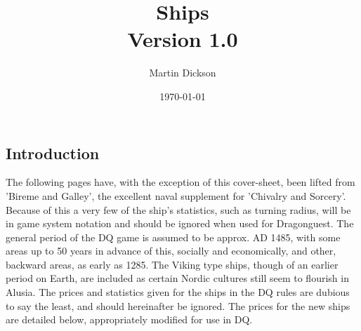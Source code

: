 \documentclass{article}
\title{Ships\\Version 1.0}
\author{Martin Dickson}
\date{\today}
\begin{document}
\maketitle

\tableofcontents

\pagebreak

\begin{multicols}{3}

\section{Introduction}

The following pages have, with the exception of this cover-sheet, been
lifted from 'Bireme and Galley', the excellent naval supplement for
'Chivalry and Sorcery'.  Because of this a very few of the ship's
statistics, such as turning radius, will be in game system notation
and should be ignored when used for Dragonguest.  The general period
of the DQ game is assumed to be approx. AD 1485, with some areas up to
50 years in advance of this, socially and economically, and other,
backward areas, as early as 1285.  The Viking type ships, though of an
earlier period on Earth, are included as certain Nordic cultures still
seem to flourish in Alusia.  The prices and statistics given for the
ships in the DQ rules are dubious to say the least, and should
hereinafter be ignored.  The prices for the new ships are detailed
below, appropriately modified for use in DQ.

\smallskip


\end{multicols}
\end{document}
